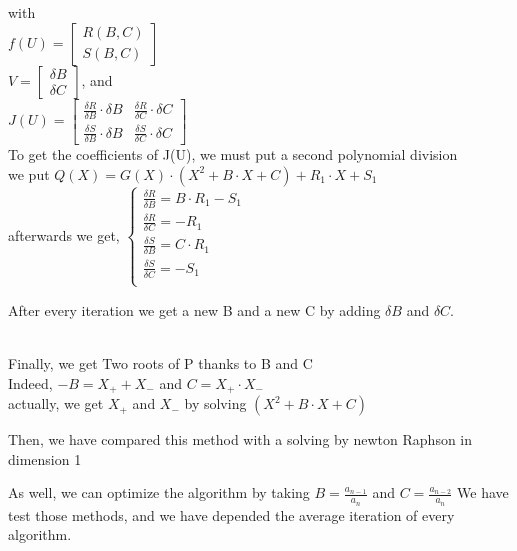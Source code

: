 \documentclass[22pt]{report}
\begin{document}
with\\ 
$f(U) = \left[ \begin{array}{ccc}
    R(B, C) \\
    S(B, C) 
    \end{array} \right]$ \\

$V = \left[ \begin{array}{ccc}
    \delta B \\
    \delta C 
    \end{array} \right]$, and\\  

$ J(U) = \left[ \begin{array}{ccc}
    \frac{\delta R}{\delta B} \cdot \delta B & \frac{\delta R}{\delta C} \cdot \delta C \\
    \frac{\delta S}{\delta B} \cdot \delta B & \frac{\delta S}{\delta C} \cdot \delta C
    \end{array} \right] $
\\

To get the coefficients of J(U), we must put a second polynomial division \\
we put $ Q(X) = G(X) \cdot (X^2 + B \cdot X + C) + R_1 \cdot X + S_1$ \\
afterwards we get, 
$ \begin{cases}
  \frac{\delta R}{\delta B} = B \cdot R_1 - S_1\\
  \frac{\delta R}{\delta C} = -R_1\\
  \frac{\delta S}{\delta B} = C \cdot R_1\\
  \frac{\delta S}{\delta C} = -S_1\\ 
  \end{cases}$

After every iteration we get a new B and a new C by adding $\delta B$ and $\delta C$.

\\

Finally, we get Two roots of P thanks to B and C\\
Indeed, $ -B = X_+  + X_-$ and $C = X_+ \cdot X_-$\\
actually, we get $X_+$ and $X_-$ by solving $(X^2 + B \cdot X + C)$


Then, we have compared this method with a solving by newton Raphson in dimension 1

As well, we can optimize the algorithm by taking $B = \frac{a_{n-1}}{a_n}$ and $C = \frac{a_{n-2}}{a_n}$
\newpage
We have test those methods, and we have depended the average iteration of every algorithm.
\end{document}
